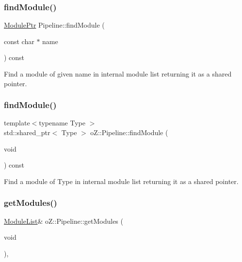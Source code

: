 \subsubsection{\texorpdfstring{findModule()}{findModule()}\hspace{0.1cm}{\footnotesize\ttfamily [1/2]}}
{\footnotesize\ttfamily \mbox{\hyperlink{namespaceo_z_af5a56aaaee027504979038f38991adcf}{Module\+Ptr}} Pipeline\+::find\+Module (\begin{DoxyParamCaption}\item[{const char $\ast$}]{name }\end{DoxyParamCaption}) const}



Find a module of given name in internal module list returning it as a shared pointer. 

\mbox{\label{classo_z_1_1_pipeline_a4f1abc0f7c0985dbc859cd5b20082998}} 
\subsubsection{\texorpdfstring{findModule()}{findModule()}\hspace{0.1cm}{\footnotesize\ttfamily [2/2]}}
{\footnotesize\ttfamily template$<$typename Type $>$ \\
std\+::shared\+\_\+ptr$<$ Type $>$ o\+Z\+::\+Pipeline\+::find\+Module (\begin{DoxyParamCaption}\item[{void}]{ }\end{DoxyParamCaption}) const}



Find a module of Type in internal module list returning it as a shared pointer. 

\mbox{\label{classo_z_1_1_pipeline_a3886c29b903d2e359a853ea76711661b}} 
\subsubsection{\texorpdfstring{getModules()}{getModules()}\hspace{0.1cm}{\footnotesize\ttfamily [1/2]}}
{\footnotesize\ttfamily \mbox{\hyperlink{classo_z_1_1_pipeline_a3bb478d291a83763b269d8d27e186a47}{Module\+List}}\& o\+Z\+::\+Pipeline\+::get\+Modules (\begin{DoxyParamCaption}\item[{void}]{ }\end{DoxyParamCaption})\hspace{0.3cm}{\ttfamily [inline]}, {\ttfamily [noexcept]}}



